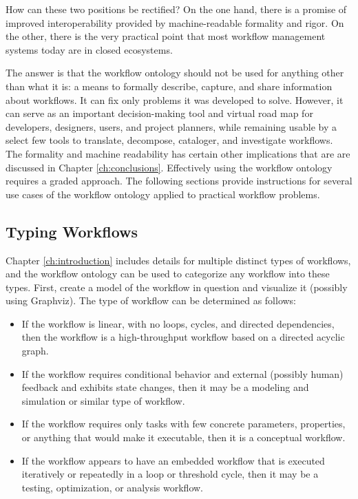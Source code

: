 How can these two positions be rectified? On the one hand, there is a promise of
improved interoperability provided by machine-readable formality and rigor. On
the other, there is the very practical point that most workflow management
systems today are in closed ecosystems.

The answer is that the workflow ontology should not be used for anything other
than what it is: a means to formally describe, capture, and share information
about workflows. It can fix only problems it was developed to solve. However, it
can serve as an important decision-making tool and virtual road map for
developers, designers, users, and project planners, while remaining
usable by a select few tools to translate, decompose,
cataloger, and investigate workflows. The formality and machine readability
has certain other implications that are are discussed in Chapter
\ref{ch:conclusions}. Effectively using the workflow ontology requires a graded
approach. The following sections provide instructions for several use cases of
the workflow ontology applied to practical workflow problems.

\subsection{Typing Workflows}

Chapter \ref{ch:introduction} includes details for multiple distinct types of
workflows, and the workflow ontology can be used to categorize any workflow into
these types. First, create a model of the workflow in question and visualize it
(possibly using Graphviz). The type of workflow can be determined as follows:
\begin{itemize}
  \item If the workflow is linear, with no loops, cycles, and directed
  dependencies, then the workflow is a high-throughput workflow based on a
  directed acyclic graph.
  \item If the workflow requires conditional behavior and external (possibly
  human) feedback and exhibits state changes, then it may be a
  modeling and simulation or similar type of workflow.
  \item If the workflow requires only tasks with few concrete parameters,
  properties, or anything that would make it executable, then it is a conceptual
  workflow.
  \item If the workflow appears to have an embedded workflow that is executed
  iteratively or repeatedly in a loop or threshold cycle, then it may be a
  testing, optimization, or analysis workflow.
\end{itemize}

